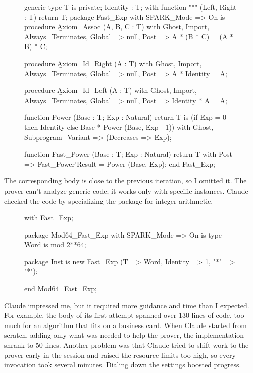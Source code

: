 \documentclass{article}
\begin{document}
\begin{figure}
\begin{code}[linenumbers]
generic
   type T is private;
   Identity : T;
   with function "*" (Left, Right : T) return T;
package Fast\_Exp
  with SPARK\_Mode => On
is
   procedure \b{Axiom\_Assoc} (A, B, C : T) with
     Ghost, Import, Always\_Terminates, Global => null,
     Post => A * (B * C) = (A * B) * C;

   procedure \b{Axiom\_Id\_Right} (A : T) with
     Ghost, Import, Always\_Terminates, Global => null,
     Post => A * Identity = A;

   procedure \b{Axiom\_Id\_Left} (A : T) with
     Ghost, Import, Always\_Terminates, Global => null,
     Post => Identity * A = A;

   function \b{Power} (Base : T; Exp : Natural) return T is
     (if Exp = 0 then Identity else Base * Power (Base, Exp - 1))
     with Ghost,
          Subprogram\_Variant => (Decreases => Exp);

   function \b{Fast\_Power} (Base : T; Exp : Natural) return T
     with Post => Fast\_Power'Result = Power (Base, Exp);
end Fast\_Exp;
\end{code}
\end{figure}

The corresponding body is close to the previous iteration, so I omitted it.
The prover can't analyze generic code;
it works only with specific instances.
Claude checked the code by specializing the package for integer arithmetic.

\begin{figure}
\begin{code}[linenumbers]
with Fast\_Exp;

package Mod64\_Fast\_Exp
  with SPARK\_Mode => On
is
   type Word is mod 2**64;

   package Inst is new Fast\_Exp
     (T => Word, Identity => 1, "*" => "*");

end Mod64\_Fast\_Exp;
\end{code}
\end{figure}

Claude impressed me,
but it required more guidance and time than I expected.
For example, the body of its first attempt spanned over 130 lines of code,
too much for an algorithm that fits on a business card.
When Claude started from scratch,
adding only what was needed to help the prover,
the implementation shrank to 50 lines.
Another problem was that Claude tried to shift work to the prover early in the session and raised the resource limits too high,
so every invocation took several minutes.
Dialing down the settings boosted progress.
\end{document}
